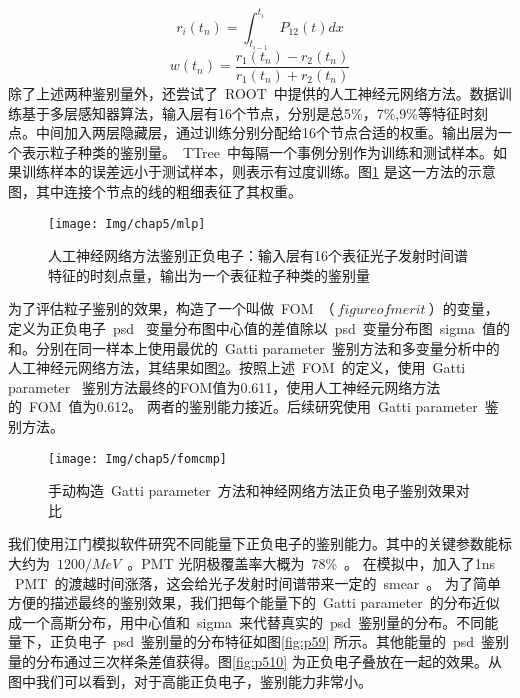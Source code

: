  \begin{equation*}
 r_{i}(t_{n})=\int_{t_{i-1}}^{t_{i}}P_{12}(t)dx
 \end{equation*}
 \begin{equation*}
 w(t_{n})=\frac{r_{1}(t_{n})-r_{2}(t_{n})}{r_{1}(t_{n})+r_{2}(t_{n})}
 \end{equation*}
除了上述两种鉴别量外，还尝试了~ROOT~中提供的人工神经元网络方法。数据训练基于多层感知器算法，输入层有16个节点，分别是总5\%，7\%,9\%等特征时刻点。中间加入两层隐藏层，通过训练分别分配给16个节点合适的权重。输出层为一个表示粒子种类的鉴别量。~TTree~中每隔一个事例分别作为训练和测试样本。如果训练样本的误差远小于测试样本，则表示有过度训练。图\ref{fig:p57} 是这一方法的示意图，其中连接个节点的线的粗细表征了其权重。
\begin{figure}[!htbp]
  \centering
   \texttt{[image: Img/chap5/mlp]}
    \caption{人工神经网络方法鉴别正负电子：输入层有16个表征光子发射时间谱特征的时刻点量，输出为一个表征粒子种类的鉴别量}
  \label{fig:p57}
\end{figure}
为了评估粒子鉴别的效果，构造了一个叫做~FOM~$（~figure of merit~）$的变量，定义为正负电子~psd~ 变量分布图中心值的差值除以~psd~变量分布图~sigma~值的和。分别在同一样本上使用最优的~Gatti parameter~鉴别方法和多变量分析中的人工神经元网络方法，其结果如图\ref{fig:p58}。按照上述~FOM~的定义，使用~Gatti parameter~ 鉴别方法最终的FOM值为0.611，使用人工神经元网络方法的~FOM~值为0.612。 两者的鉴别能力接近。后续研究使用~Gatti parameter~鉴别方法。
\begin{figure}[!htbp]
  \centering
   \texttt{[image: Img/chap5/fomcmp]}
    \caption{手动构造~Gatti parameter~方法和神经网络方法正负电子鉴别效果对比}
  \label{fig:p58}
\end{figure}
我们使用江门模拟软件研究不同能量下正负电子的鉴别能力。其中的关键参数能标大约为~$1200/MeV$~。PMT 光阴极覆盖率大概为~78\%~。 在模拟中，加入了1ns ~PMT~的渡越时间涨落，这会给光子发射时间谱带来一定的~smear~。 为了简单方便的描述最终的鉴别效果，我们把每个能量下的~Gatti parameter~的分布近似成一个高斯分布，用中心值和~sigma~来代替真实的~psd~鉴别量的分布。不同能量下，正负电子~psd~鉴别量的分布特征如图\ref{fig:p59} 所示。其他能量的~psd~鉴别量的分布通过三次样条差值获得。图\ref{fig:p510} 为正负电子叠放在一起的效果。从图中我们可以看到，对于高能正负电子，鉴别能力非常小。

